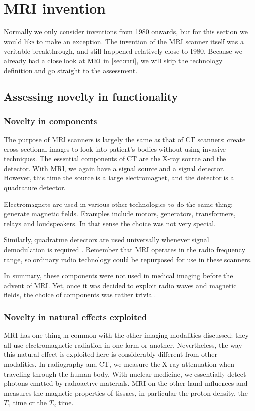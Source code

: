 \section{MRI invention}
Normally we only consider inventions from 1980 onwards, but for this section we
would like to make an exception. The invention of the MRI scanner itself was a
veritable breakthrough, and still happened relatively close to 1980. Because we
already had a close look at MRI in \autoref{sec:mri}, we will skip the
technology definition and go straight to the assessment.

\subsection{Assessing novelty in functionality}
\subsubsection{Novelty in components}
The purpose of MRI scanners is largely the same as that of CT scanners: create
cross-sectional images to look into patient's bodies without using invasive
techniques. The essential components of CT are the X-ray source and the
detector. With MRI, we again have a signal source and a signal detector.
However, this time the source is a large electromagnet, and the detector is a
quadrature detector.

Electromagnets are used in various other technologies to do the same thing:
generate magnetic fields. Examples include motors, generators, transformers,
relays and loudspeakers. In that sense the choice was not very special.

Similarly, quadrature detectors are used universally whenever signal
demodulation is required \cite{quadrature}. Remember that MRI operates in the
radio frequency range, so ordinary radio technology could be repurposed for use
in these scanners.

In summary, these components were not used in medical imaging before the advent
of MRI. Yet, once it was decided to exploit radio waves and magnetic fields, the
choice of components was rather trivial.

\subsubsection{Novelty in natural effects exploited}
MRI has one thing in common with the other imaging modalities discussed: they
all use electromagnetic radiation in one form or another. Nevertheless, the way
this natural effect is exploited here is considerably different from other
modalities. In radiography and CT, we measure the X-ray attenuation when
traveling through the human body. With nuclear medicine, we essentially detect
photons emitted by radioactive materials. MRI on the other hand influences and
measures the magnetic properties of tissues, in particular the proton density,
the $T_1$ time or the $T_2$ time.

